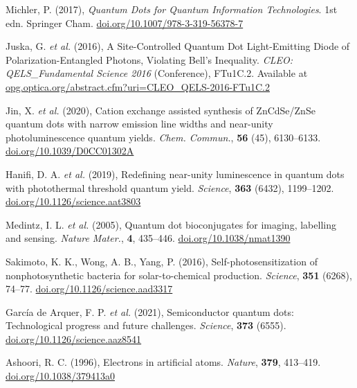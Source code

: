 \documentclass[12pt]{article}
\numberwithin{equation}{section}
\begin{document}
\begin{thebibliography}{10}

Michler, P. (2017), \textit{Quantum Dots for Quantum Information Technologies}. 1st edn. Springer Cham. \href{https://doi.org/10.1007/978-3-319-56378-7}{doi.org/10.1007/978-3-319-56378-7}

Juska, G. \textit{et al.} (2016), A Site-Controlled Quantum Dot Light-Emitting Diode of Polarization-Entangled Photons, Violating Bell's Inequality. \textit{CLEO: QELS\_Fundamental Science 2016} (Conference), FTu1C.2. Available at \href{https://opg.optica.org/abstract.cfm?uri=CLEO\_QELS-2016-FTu1C.2}{opg.optica.org/abstract.cfm?uri=CLEO\_QELS-2016-FTu1C.2}

Jin, X. \textit{et al.} (2020), Cation exchange assisted synthesis of ZnCdSe/ZnSe quantum dots with narrow emission line widths and near-unity photoluminescence quantum yields. \textit{Chem. Commun.}, \textbf{56} (45), 6130--6133. \href{https://doi.org/10.1039/D0CC01302A}{doi.org/10.1039/D0CC01302A}

Hanifi, D. A. \textit{et al.} (2019), Redefining near-unity luminescence in quantum dots with photothermal threshold quantum yield. \textit{Science}, \textbf{363} (6432), 1199--1202. \href{https://doi.org/10.1126/science.aat3803}{doi.org/10.1126/science.aat3803}

Medintz, I. L. \textit{et al.} (2005),
Quantum dot bioconjugates for imaging, labelling and sensing. \textit{Nature Mater.}, \textbf{4}, 435--446. \href{https://doi.org/10.1038/nmat1390}{doi.org/10.1038/nmat1390}

Sakimoto, K. K., Wong, A. B., Yang, P. (2016), Self-photosensitization
of nonphotosynthetic bacteria for solar-to-chemical production. \textit{Science}, \textbf{351} (6268), 74--77. \href{https://doi.org/10.1126/science.aad3317}{doi.org/10.1126/science.aad3317}

García de Arquer, F. P. \textit{et al.} (2021), Semiconductor quantum dots: Technological progress and future challenges. \textit{Science}, \textbf{373} (6555). \href{https://doi.org/10.1126/science.aaz8541}{doi.org/10.1126/science.aaz8541}

Ashoori, R. C. (1996), Electrons in artificial atoms. \textit{Nature}, \textbf{379}, 413--419. \href{https://doi.org/10.1038/379413a0}{doi.org/10.1038/379413a0}


\end{thebibliography}
\end{document}
